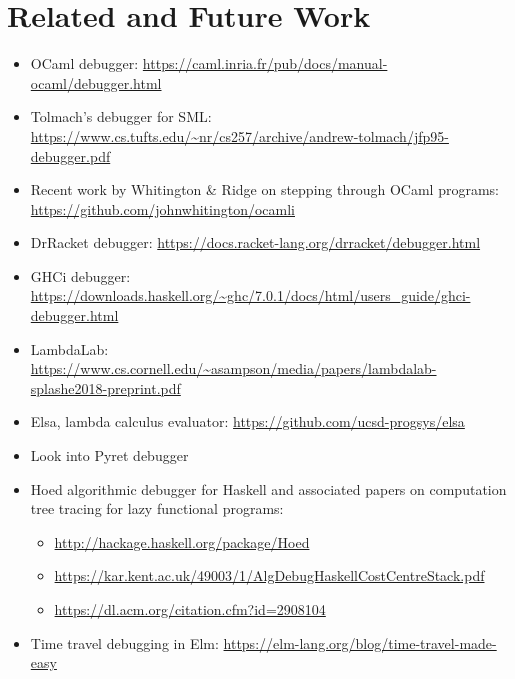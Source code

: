 \newcommand{\relatedWorkSection}{Related and Future Work}
\section{\relatedWorkSection} %
\label{sec:relatedWork}

\begin{itemize}
\item OCaml debugger: \url{https://caml.inria.fr/pub/docs/manual-ocaml/debugger.html}
\item Tolmach's debugger for SML: \url{https://www.cs.tufts.edu/~nr/cs257/archive/andrew-tolmach/jfp95-debugger.pdf}
\item Recent work by Whitington \& Ridge on stepping through OCaml programs: \url{https://github.com/johnwhitington/ocamli}
\item DrRacket debugger: \url{https://docs.racket-lang.org/drracket/debugger.html}
\item GHCi debugger: \url{https://downloads.haskell.org/~ghc/7.0.1/docs/html/users_guide/ghci-debugger.html}
\item LambdaLab: \url{https://www.cs.cornell.edu/~asampson/media/papers/lambdalab-splashe2018-preprint.pdf}
\item Elsa, lambda calculus evaluator: \url{https://github.com/ucsd-progsys/elsa}
\item Look into Pyret debugger
\item Hoed algorithmic debugger for Haskell and associated papers on computation tree tracing for lazy functional programs: 
	\begin{itemize}
	\item \url{http://hackage.haskell.org/package/Hoed}
	\item \url{https://kar.kent.ac.uk/49003/1/AlgDebugHaskellCostCentreStack.pdf}
	\item \url{https://dl.acm.org/citation.cfm?id=2908104}
	\end{itemize}
\item Time travel debugging in Elm: \url{https://elm-lang.org/blog/time-travel-made-easy}
\end{itemize}

